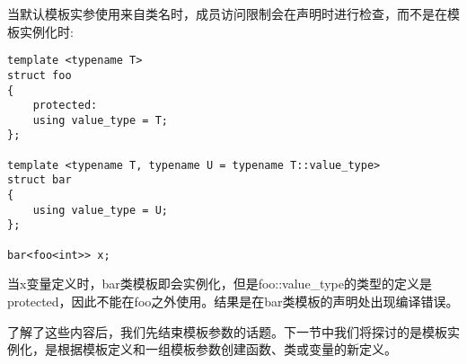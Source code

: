 当默认模板实参使用来自类名时，成员访问限制会在声明时进行检查，而不是在模板实例化时:

\begin{lstlisting}[style=styleCXX]
template <typename T>
struct foo
{
	protected:
	using value_type = T;
};

template <typename T, typename U = typename T::value_type>
struct bar
{
	using value_type = U;
};

bar<foo<int>> x;
\end{lstlisting}

当x变量定义时，bar类模板即会实例化，但是foo::value\_type的类型的定义是protected，因此不能在foo之外使用。结果是在bar类模板的声明处出现编译错误。

了解了这些内容后，我们先结束模板参数的话题。下一节中我们将探讨的是模板实例化，是根据模板定义和一组模板参数创建函数、类或变量的新定义。








